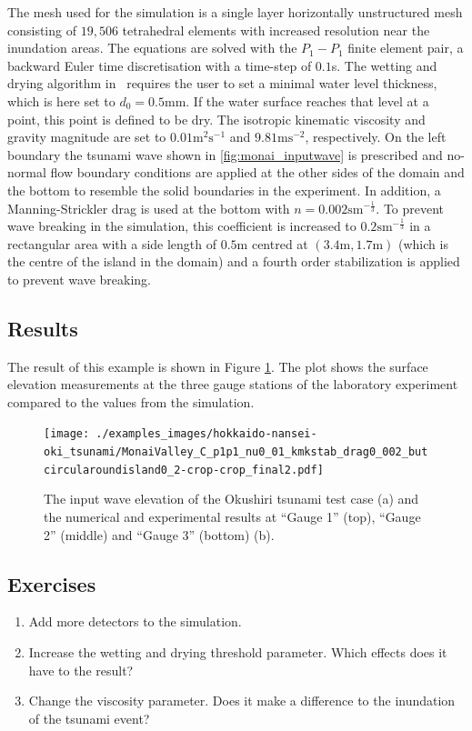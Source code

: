 The mesh used for the simulation is a single layer horizontally unstructured mesh consisting of $19,506$ tetrahedral elements with increased resolution near the inundation areas.
The equations are solved with the $P_1-P_1$ finite element pair, a backward Euler time discretisation with a time-step of $0.1$s.
The wetting and drying algorithm in \fluidity\ requires the user to set a minimal water level thickness, which is here set to $d_0=0.5$mm. If the water surface reaches that level at a point, this point is defined to be dry.
The isotropic kinematic viscosity and gravity magnitude are set to $0.01\mbox{m}^{2}\mbox{s}^{-1}$ and $9.81\mbox{ms}^{-2}$, respectively.
On the left boundary the tsunami wave shown in \ref{fig:monai_inputwave} is prescribed and no-normal flow boundary conditions are applied at the other sides of the domain and the bottom to resemble the solid boundaries in the experiment.
In addition, a Manning-Strickler drag is used at the bottom with $n=0.002\mbox{sm}^{-\frac{1}{3}}$.
To prevent wave breaking in the simulation, this coefficient is increased to $0.2\mbox{sm}^{-\frac{1}{3}}$ in a rectangular area with a side length of $0.5$m centred at $(3.4\mbox{m}, 1.7\mbox{m})$ (which is the centre of the island in the domain) and a fourth order stabilization is applied to prevent wave breaking. 

\subsection{Results}
The result of this example is shown in Figure \ref{fig:monai_results}. 
The plot shows the surface elevation measurements at the three gauge stations of the laboratory experiment compared to the values from the simulation.
\begin{figure}
\begin{center}
\texttt{[image: ./examples\_images/hokkaido-nansei-oki\_tsunami/MonaiValley\_C\_p1p1\_nu0\_01\_kmkstab\_drag0\_002\_butcircularoundisland0\_2-crop-crop\_final2.pdf]}
\caption{The input wave elevation of the Okushiri tsunami test case (a) and the numerical and experimental results at ``Gauge 1'' (top), ``Gauge 2'' (middle) and ``Gauge 3'' (bottom) (b).}\label{fig:monai_results}
\end{center}
\end{figure}

\subsection{Exercises}
\begin{enumerate}
\item Add more detectors to the simulation.
\item Increase the wetting and drying threshold parameter. Which effects does it have to the result?
\item Change the viscosity parameter. Does it make a difference to the inundation of the tsunami event?
\end{enumerate}



